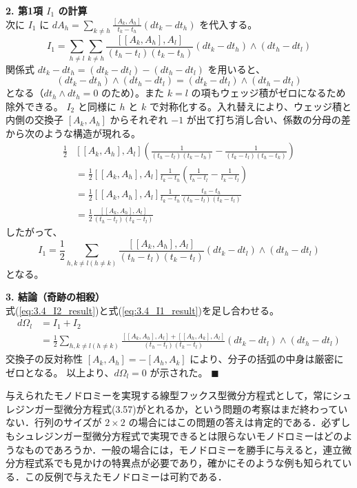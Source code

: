 \textbf{2. 第1項 $I_1$ の計算} \\
次に $I_1$ に $dA_h = \sum_{k \neq h} \frac{[A_k, A_h]}{t_k - t_h}(dt_k - dt_h)$ を代入する。
\[
  I_1 = \sum_{h \neq l} \sum_{k \neq h} \frac{[[A_k, A_h], A_l]}{(t_h - t_l)(t_k - t_h)} (dt_k - dt_h) \wedge (dt_h - dt_l)
\]
関係式 $dt_k - dt_h = (dt_k - dt_l) - (dt_h - dt_l)$ を用いると、
\[
  (dt_k - dt_h) \wedge (dt_h - dt_l) = (dt_k - dt_l) \wedge (dt_h - dt_l)
\]
となる（$dt_h \wedge dt_h = 0$ のため）。また $k=l$ の項もウェッジ積がゼロになるため除外できる。
$I_2$ と同様に $h$ と $k$ で対称化する。入れ替えにより、ウェッジ積と内側の交換子 $[A_k, A_h]$ からそれぞれ $-1$ が出て打ち消し合い、係数の分母の差から次のような構造が現れる。
\begin{align*}
  \frac{1}{2} & [[A_k, A_h], A_l] \left( \frac{1}{(t_h - t_l)(t_k - t_h)} - \frac{1}{(t_k - t_l)(t_h - t_k)} \right) \\
  &= \frac{1}{2} [[A_k, A_h], A_l] \frac{1}{t_k - t_h} \left( \frac{1}{t_h - t_l} - \frac{1}{t_k - t_l} \right) \\
  &= \frac{1}{2} [[A_k, A_h], A_l] \frac{1}{t_k - t_h} \frac{t_k - t_h}{(t_h - t_l)(t_k - t_l)} \\
  &= \frac{1}{2} \frac{[[A_k, A_h], A_l]}{(t_h - t_l)(t_k - t_l)}
\end{align*}
したがって、
\begin{equation}
  I_1 = \frac{1}{2} \sum_{h, k \neq l (h \neq k)} \frac{[[A_k, A_h], A_l]}{(t_h - t_l)(t_k - t_l)} (dt_k - dt_l) \wedge (dt_h - dt_l)
  \label{eq:3.4_I1_result}
\end{equation}
となる。

\textbf{3. 結論（奇跡の相殺）} \\
式(\eqref{eq:3.4_I2_result})と式(\eqref{eq:3.4_I1_result})を足し合わせる。
\begin{align*}
  d\Omega_l &= I_1 + I_2 \\
  &= \frac{1}{2} \sum_{h, k \neq l (h \neq k)} \frac{ [[A_k, A_h], A_l] + [[A_h, A_k], A_l] }{(t_h - t_l)(t_k - t_l)} (dt_k - dt_l) \wedge (dt_h - dt_l)
\end{align*}
交換子の反対称性 $[A_k, A_h] = -[A_h, A_k]$ により、分子の括弧の中身は厳密にゼロとなる。
以上より、$d\Omega_l = 0$ が示された。 \hfill $\blacksquare$

与えられたモノドロミーを実現する線型フックス型微分方程式として，常にシュレジンガー型微分方程式(3.57)がとれるか，という問題の考察はまだ終わっていない．行列のサイズが $2 \times 2$ の場合にはこの問題の答えは肯定的である．必ずしもシュレジンガー型微分方程式で実現できるとは限らないモノドロミーはどのようなものであろうか．一般の場合には，モノドロミーを勝手に与えると，連立微分方程式系でも見かけの特異点が必要であり，確かにそのような例も知られている．この反例で与えたモノドロミーは可約である．

